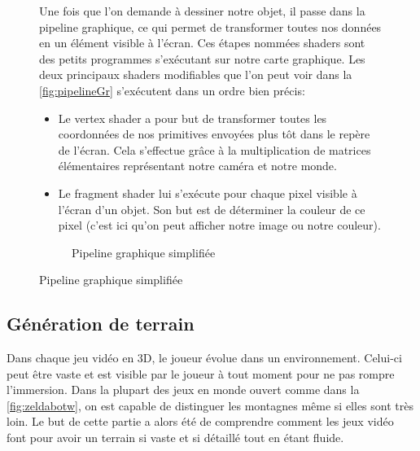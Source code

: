 \begin{figure}[H]
	\begin{minipage}[t!]{0.50\textwidth} %
		Une fois que l'on demande à dessiner notre objet, il passe dans la pipeline graphique, ce qui permet de transformer toutes nos données en un élément visible à l'écran. Ces étapes nommées shaders sont des petits programmes s'exécutant sur notre carte graphique. Les deux principaux shaders modifiables que l'on peut voir dans la \autoref{fig:pipelineGr} s'exécutent dans un ordre bien précis:
		\begin{itemize}
			\item Le vertex shader a pour but de transformer toutes les coordonnées de nos primitives envoyées plus tôt dans le repère de l'écran. Cela s'effectue grâce à la multiplication de matrices élémentaires représentant notre caméra et notre \og monde\fg.
			\item Le fragment shader lui s'exécute pour chaque pixel visible à l'écran d'un objet. Son but est de déterminer la couleur de ce pixel (c'est ici qu'on peut afficher notre image ou notre couleur).
		\end{itemize}
	\end{minipage}
	\hfill %
	\begin{minipage}[t!]{0.45\textwidth} %
		\begin{figure}[H]	
			\centering		
			\caption{Pipeline graphique simplifiée}
			\label{fig:pipelineGr}
		\end{figure}
	\end{minipage}
\end{figure}


\subsection{Génération de terrain}

Dans chaque jeu vidéo en 3D, le joueur évolue dans un environnement. Celui-ci peut être vaste et est visible par le joueur à tout moment pour ne pas rompre l'immersion. Dans la plupart des jeux en monde ouvert comme dans la \autoref{fig:zeldabotw}, on est capable de distinguer les montagnes même si elles sont très loin. Le but de cette partie a alors été de comprendre comment les jeux vidéo font pour avoir un terrain si vaste et si détaillé tout en étant fluide.


